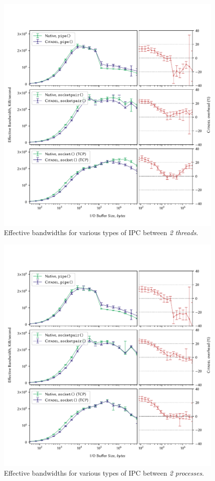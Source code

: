\begin{figure}[]
    \centering
    \includegraphics[width=\linewidth]{figures/graphs/ipc-2thread.pdf}
    \vspace{-5mm}
    \caption{Effective bandwidths for various types of IPC between \textit{2 threads}.}
    \label{fig:ipc-2thread-graph}
\end{figure}


\begin{figure}[]
    \centering
    \includegraphics[width=\linewidth]{figures/graphs/ipc-2proc.pdf}
    \vspace{-5mm}
    \caption{Effective bandwidths for various types of IPC between \textit{2 processes}.}
    \label{fig:ipc-2proc-graph}
\end{figure}